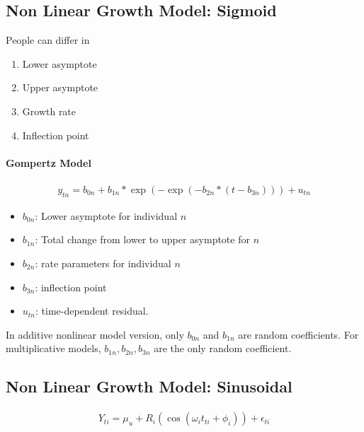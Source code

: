 \subsection{Non Linear Growth Model: Sigmoid} 
People can differ in 
    \begin{enumerate}
        \item Lower asymptote
        \item Upper asymptote 
        \item Growth rate
        \item Inflection point 
    \end{enumerate}
    
\paragraph{Gompertz Model} 
\begin{align*}
    y_{tn} = b_{0n} + b_{1n} * \exp(-\exp(-b_{2n} * (t-b_{3n}))) + u_{tn}
\end{align*}
    \begin{itemize}
        \item $b_{0n}$: Lower asymptote for individual $n$ 
        \item $b_{1n}$: Total change from lower to upper asymptote for $n$ 
        \item $b_{2n}$: rate parameters for individual $n$ 
        \item $b_{3n}$: inflection point 
        \item $u_{tn}$: time-dependent residual. 
    \end{itemize}
In additive nonlinear model version, only $b_{0n}$ and $b_{1n}$ are random coefficients. For multiplicative models, $b_{1n}, b_{2n}, b_{3n}$ are the only random coefficient. 


\subsection{Non Linear Growth Model: Sinusoidal} 
\begin{align*}
    Y_{ti} = \mu_u +  R_i(\cos(\omega_i t_{ti} + \phi_i)) + \epsilon_{ti}
\end{align*}